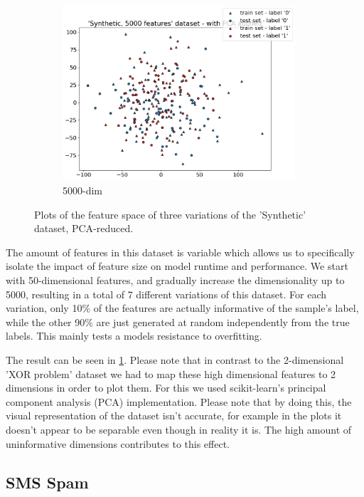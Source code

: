\begin{figure}[h]
\begin{subfigure}[t]{0.32\textwidth}
        \includegraphics[width=0.95\textwidth]{figures/'Synthetic, 5000 features' dataset - with PCA applied.png}
        \caption{5000-dim}
    \end{subfigure}
    \caption{Plots of the feature space of three variations of the 'Synthetic' dataset, PCA-reduced.}
    \label{fig:synthetic_plot}
\end{figure}

The amount of features in this dataset is variable which allows us to specifically isolate the impact of feature size on model runtime and performance. We start with 50-dimensional features, and gradually increase the dimensionality up to 5000, resulting in a total of 7 different variations of this dataset. For each variation, only 10\% of the features are actually informative of the sample's label, while the other 90\% are just generated at random independently from the true labels. This mainly tests a models resistance to overfitting.

The result can be seen in \ref{fig:synthetic_plot}. Please note that in contrast to the 2-dimensional 'XOR problem' dataset we had to map these high dimensional features to 2 dimensions in order to plot them. For this we used scikit-learn's principal component analysis (PCA) implementation. Please note that by doing this, the visual representation of the dataset isn't accurate, for example in the plots it doesn't appear to be separable even though in reality it is. The high amount of uninformative dimensions contributes to this effect.

\subsection{SMS Spam}

